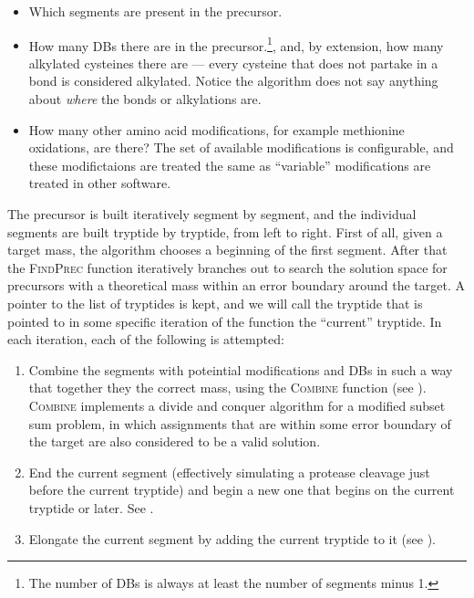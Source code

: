 \begin{itemize}
  \item  Which segments are present in the precursor.
  \item How many DBs there are in the precursor.\footnote{The number of DBs is always at least the number of segments minus 1.}, and, by extension, how many alkylated cysteines there are --- every cysteine that does not partake in a bond is considered alkylated. Notice the algorithm does not say anything about \emph{where} the bonds or alkylations are.
  \item How many other amino acid modifications, for example methionine oxidations, are there? The set of available modifications is configurable, and these modifictaions are treated the same as ``variable'' modifications are treated in other software.
\end{itemize}


The precursor is built iteratively segment by segment, and the individual segments are built tryptide by tryptide, from left to right. First of all, given a target mass, the algorithm chooses a beginning of the first segment. After that the \textsc{FindPrec} function iteratively branches out to search the solution space for precursors with a theoretical mass within an error boundary around the target. A pointer to the list of tryptides is kept, and we will call the tryptide that is pointed to in some specific iteration of the function the ``current'' tryptide. In each iteration, each of the following is attempted:

\begin{enumerate}
  \item Combine the  segments with poteintial modifications and DBs in such a way that together they the correct mass, using the \textsc{Combine} function (see ). \textsc{Combine} implements a divide and conquer algorithm for a modified subset sum problem, in which assignments that are within some error boundary of the target are also considered to be a valid solution.
  \item End the current segment (effectively simulating a protease cleavage just before the current tryptide) and begin a new one that begins on the current tryptide or later. See .
  \item Elongate the current segment by adding the current tryptide to it (see ).
\end{enumerate}

